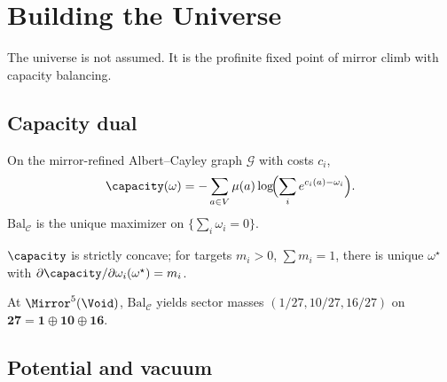 \section{Building the Universe}
\label{sec:universe}

The universe is not assumed. It is the profinite fixed point of mirror climb
with capacity balancing.

\subsection{Capacity dual}
\label{sec:universe:capacity}

\begin{definition}\label{def:capacity}
On the mirror-refined Albert--Cayley graph $\mathcal{G}$ with costs $c_i$,
\begin{equation}\label{eq:capacity}
  \capacity(\omega)=-\sum_{a\in V}\mu(a)\log\!\Bigl(\sum_i e^{c_i(a)-\omega_i}\Bigr).
\end{equation}
$\mathrm{Bal}_{\mathcal{C}}$ is the unique maximizer on $\{\sum_i\omega_i=0\}$.
\end{definition}

\begin{theorem}[Concavity]\label{thm:concave}
$\capacity$ is strictly concave; for targets $m_i>0$, $\sum m_i=1$, there is
unique $\omega^\star$ with $\partial\capacity/\partial\omega_i(\omega^\star)=m_i$.
\end{theorem}

\begin{theorem}[$1|10|16$ partition]\label{thm:partition}
At $\Mirror^5(\Void)$, $\mathrm{Bal}_{\mathcal{C}}$ yields sector masses
$(1/27,10/27,16/27)$ on $\mathbf{27}=\mathbf{1}\oplus\mathbf{10}\oplus\mathbf{16}$.
\end{theorem}

\subsection{Potential and vacuum}
\label{sec:universe:potential}

